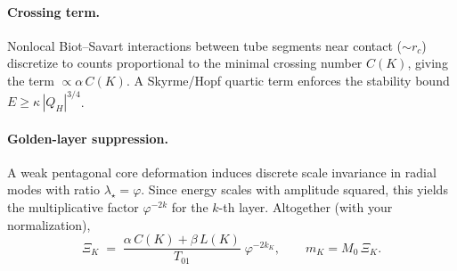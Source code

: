 \paragraph*{Crossing term.}
Nonlocal Biot--Savart interactions between tube segments near contact (\(\sim r_c\)) discretize to counts proportional to the minimal crossing number \(C(K)\), giving
the term \(\propto \alpha\,C(K)\). A Skyrme/Hopf quartic term enforces the stability bound \(E\ge \kappa\,|Q_H|^{3/4}\).

\paragraph*{Golden-layer suppression.}
A weak pentagonal core deformation induces discrete scale invariance in radial modes with ratio \(\lambda_\star=\varphi\).
Since energy scales with amplitude squared, this yields the multiplicative factor \(\varphi^{-2k}\) for the \(k\)-th layer.
Altogether (with your normalization),
\begin{equation}
\Xi_K \;=\; \frac{\alpha\,C(K)+\beta\,L(K)}{T_{01}}\;\varphi^{-2k_K},\qquad m_K = M_0\,\Xi_K.
\end{equation}

